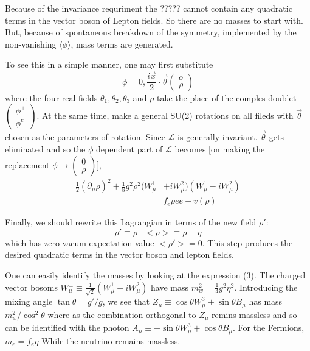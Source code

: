 Because of the invariance requriment the ????? cannot contain any quadratic terms in the vector boson of Lepton fields. So there are no masses to start with. But, because of spontaneous breakdown of the symmetry, implemented by the non-vanishing $\langle \phi \rangle$, mass terms are generated.

To see this in a simple manner, one may first substitute
\begin{equation}
\phi = 0, \frac{i \vec{x}}{2} \cdot \vec{\theta}\begin{pmatrix}o\\ \rho \end{pmatrix}\tag{2}
\end{equation}
where the four real fields $\theta_{1}, \theta_{2}, \theta_{3}$ and $\rho$ take the place of the comples doublet $\begin{pmatrix}\phi^{+}\\ \phi^{c} \end{pmatrix}$. At the same time, make a general SU(2) rotations on all fileds with $\vec{\theta}$ chosen as the parameters of rotation. Since $\mathcal{L}$ is generally invariant. $\vec{\theta}$ gets eliminated and so the $\phi$ dependent part of $\mathcal{L}$ becomes [on making the replacement $\phi \rightarrow \begin{pmatrix}0\\ \rho \end{pmatrix}$],
\begin{align*}
\frac{1}{2}(\partial_{\mu} \rho)^{2} + \frac{1}{8} g^{2} \rho^{2} (W_{\mu}^{1} & + i W^{2}_{\mu})(W_{\mu}^{1}-i W^{2}_{\mu})\\
 & f_{e}\rho \bar{e}e + v(\rho)\tag{3}
\end{align*}

Finally, we should rewrite this Lagrangian in terms of the new field $\rho'$:
$$
\rho' \equiv \rho - <\rho> \equiv \rho - \eta
$$
which has zero vacum expectation value $< \rho'> = 0.$ This step produces the desired quadratic terms in the vector boson and lepton fields.

One can easily identify the masses by looking at the expression (3). The charged vector bosoms $W_{\mu}^{\pm} \equiv \frac{1}{\sqrt{2}}(W_{\mu}^{1} \pm i W_{\mu}^{2})$ have mass $m_{w}^{2} = \frac{1}{4}g^{2}\eta^{2}$. Introducing the mixing angle $\tan \theta = g'/g$, we see that $Z_{\mu} \equiv \cos \theta W_{\mu}^{3} + \sin \theta B_{\mu}$ has mass $m^{2}_{w}/\cos^{2}\theta$ where as the combination orthogonal to $Z_{\mu}$ remins massless and so can be identified with the photon $A_{\mu}\equiv - \sin \theta W_{\mu}^{3} + \cos \theta B_{\mu}$. For the Fermions, $m_{e} = f_{e}\eta$ While the neutrino  remains massless.

